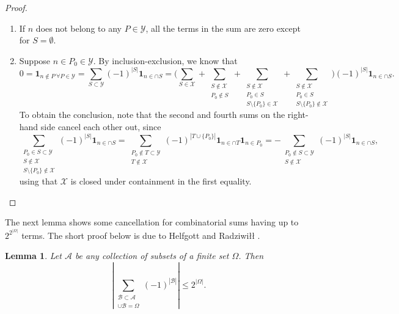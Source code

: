 \documentclass[11pt]{amsart}
\newtheorem{lemma}[theorem]{Lemma}
\theoremstyle{definition}
\renewcommand{\leq}{\leqslant}
\newcommand{\abs}[1]{\left|#1\right|}
\newcommand{\ind}[1]{\mathbf{1}_{#1}}
\newcommand{\prohibprog}{\mathcal{Y}}
\newcommand{\T}{T}
\newcommand{\appendixsubcoll}{\mathcal{X}}
\begin{document}
\begin{proof}
\begin{enumerate}
	\item If $n$ does not belong to any $P\in \prohibprog$, all the terms in the sum are zero except for $S = \emptyset$.  
	\item Suppose $n\in P_0 \in \prohibprog$. By inclusion-exclusion, we know that 
	\begin{equation*}
		0 = \ind{n\not\in P\  \forall P\in \prohibprog}  = \sum_{S\subset \prohibprog} (-1)^{|S|} \ind{n \in \cap S} = \Bigg(\sum_{S\in \appendixsubcoll}+ \sum_{\substack{S\not\in \appendixsubcoll \\ P_0\not \in S}} + \sum_{\substack{S\not\in \appendixsubcoll \\ P_0\in S\\ S\setminus \{P_0\}\in \appendixsubcoll}}+ \sum_{\substack{S\not\in \appendixsubcoll \\ P_0\in S\\ S\setminus \{P_0\}\not\in \appendixsubcoll}}\Bigg) (-1)^{|S|} \ind{n \in \cap S}.
	\end{equation*}
	To obtain the conclusion, note that the second and fourth sums on the right-hand side cancel each other out, since 
	\begin{equation*}
	\sum_{\substack{P_0\in S \subset \prohibprog\\ S\not\in \appendixsubcoll \\  S\setminus \{P_0\}\not\in \appendixsubcoll}} (-1)^{|S|} \ind{n \in \cap S} = \sum_{\substack{P_0\not\in \T \subset \prohibprog\\ \T\not\in \appendixsubcoll }} (-1)^{|\T \cup \{P_0\}|} \ind{n \in \cap \T} \ind{n\in P_0} = - \sum_{\substack{P_0\not\in S \subset \prohibprog\\ S\not\in \appendixsubcoll }} (-1)^{|S|} \ind{n \in \cap S},
	\end{equation*}
	using that $\appendixsubcoll$ is closed under containment in the first equality. \qedhere
\end{enumerate}
\end{proof}

The next lemma shows some cancellation for combinatorial sums having up to $2^{2^{|\Omega|}}$ terms. The short proof below is due to Helfgott and Radziwiłł \cite{HR}.
\begin{lemma}
\label{lem:rota}
Let $\mathcal{A}$ be any collection of subsets of a finite set $\Omega$. Then 
\begin{equation*}
\abs{\sum_{\substack{\mathcal{B} \subset \mathcal{A}\\ \cup \mathcal{B} = \Omega}} (-1)^{|\mathcal{B}|} } \leq 2^{|\Omega|}.
\end{equation*}
\end{lemma}
\end{document}
